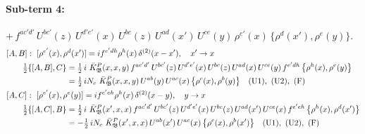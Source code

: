\documentclass[10pt]{article}
\numberwithin{equation}{section}
\begin{document}
\paragraph{Sub-term 4:} $+\,f^{ac'd'}\,U^{bc'}(z)\,U^{d'e'}(x)\,U^{bc}(z)\,U^{ad}(x')\,U^{ce}(y)\,\rho^{e'}(x)\,\big\{\rho^{d}(x'),\rho^{e}(y)\big\}$.
\begin{align}
&[A,B]:\ [\rho^{e'}(x),\rho^{d}(x')]=i f^{e'dh}\rho^{h}(x)\,\delta^{(2)}(x-x'),\quad x'\to x\notag\\
&\qquad \tfrac12\{[A,B],C\}=\tfrac12\,i\,\,\bar K^{P}_{\mathfrak B}(x,x,y)\,f^{ac'd'}\,U^{bc'}(z)\,U^{d'e'}(x)\,U^{bc}(z)\,U^{ad}(x)\,U^{ce}(y)\,f^{e'dh}\,\big\{\rho^{h}(x),\rho^{e}(y)\big\}\notag\\
&\qquad\phantom{\tfrac12\{[A,B],C\}}=\tfrac12\,i N_{c}\,\,\bar K^{P}_{\mathfrak B}(x,x,y)\,U^{ab}(y)\,U^{ac}(x)\,\big\{\rho^{c}(x),\rho^{b}(y)\big\}\quad\text{(U1)},\ \text{(U2)},\ \text{(F)}
\label{B:eq:GII.I2.P-4-AB}\\
&[A,C]:\ [\rho^{e'}(x),\rho^{e}(y)]=i f^{e'eh}\rho^{h}(x)\,\delta^{(2)}(x-y),\quad y\to x\notag\\
&\qquad \tfrac12\{[A,C],B\}=\tfrac12\,i\,\,\bar K^{P}_{\mathfrak B}(x',x,x)\,f^{ac'd'}\,U^{bc'}(z)\,U^{d'e'}(x)\,U^{bc}(z)\,U^{ad}(x')\,U^{ce}(x)\,f^{e'eh}\,\big\{\rho^{h}(x),\rho^{d}(x')\big\}\notag\\
&\qquad\phantom{\tfrac12\{[A,C],B\}}=-\tfrac12\,i N_{c}\,\,\bar K^{P}_{\mathfrak B}(x',x,x)\,U^{ab}(x')\,U^{ac}(x)\,\big\{\rho^{c}(x),\rho^{b}(x')\big\}\quad\text{(U1)},\ \text{(U2)},\ \text{(F)}
\label{B:eq:GII.I2.P-4-AC}
\end{align}
\end{document}
